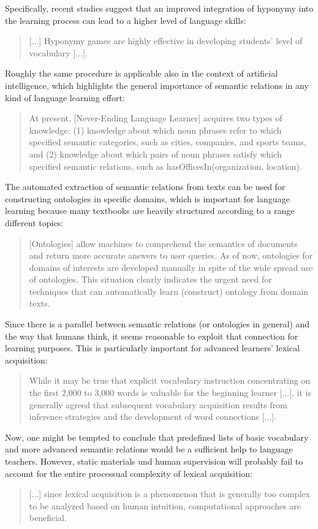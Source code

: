 \documentclass[jou]{apa6} %
\begin{document}
Specifically, recent studies suggest that an improved integration of hyponymy into the learning process can lead to a higher level of language skills: 
\blockquote[{\cite[p.~196]{taslimExperimentalStudyTeaching2014}}]{[...] Hyponymy games are highly effective in developing students' level of vocabulary [...].}
Roughly the same procedure is applicable also in the context of artificial intelligence, which highlights the general importance of semantic relations in any kind of language learning effort:
\blockquote[{\cite[p.~1306]{carlsonArchitectureNeverendingLanguage2010}}]{At present, [Never-Ending Language Learner] acquires two types of knowledge: (1) knowledge about which noun phrases refer to which specified semantic categories, such as cities, companies, and sports teams, and (2) knowledge about which pairs of noun phrases satisfy which specified semantic relations, such as hasOfficesIn(organization, location).}
The automated extraction of semantic relations from texts can be used for constructing ontologies in specific domains, which is important for language learning because many textbooks are heavily structured according to a range different topics:
\blockquote[{\cite[p.~192f.]{punuruLearningNontaxonomicalSemantic2012}}]{[Ontologies] allow machines to comprehend the semantics of documents and return more accurate answers to user queries. As of now, ontologies for domains of interests are developed manually in spite of the wide spread use of ontologies. This situation clearly indicates the urgent need for techniques that can automatically learn (construct) ontology from domain texts.}
Since there is a parallel between semantic relations (or ontologies in general) and the way that humans think, it seems reasonable to exploit that connection for learning purposes. This is particularly important for advanced learners' lexical acquisition:
\blockquote[{\cite[p.~56]{crossleyDevelopmentSemanticRelations2010}}]{While it may be true that explicit vocabulary instruction concentrating on the first 2,000 to 3,000 words is valuable for the beginning learner [...], it is generally agreed that subsequent vocabulary acquisition results from inference strategies and the development of word connections [...].}
Now, one might be tempted to conclude that predefined lists of basic vocabulary and more advanced semantic relations would be a sufficient help to language teachers. However, static materials und human supervision will probably fail to account for the entire processual complexity of lexical acquisition:
\blockquote[{\cite[p.~71]{crossleyDevelopmentSemanticRelations2010}}]{[...] since lexical acquisition is a phenomenon that is generally too complex to be analyzed based on human intuition, computational approaches are beneficial.}
\end{document}
